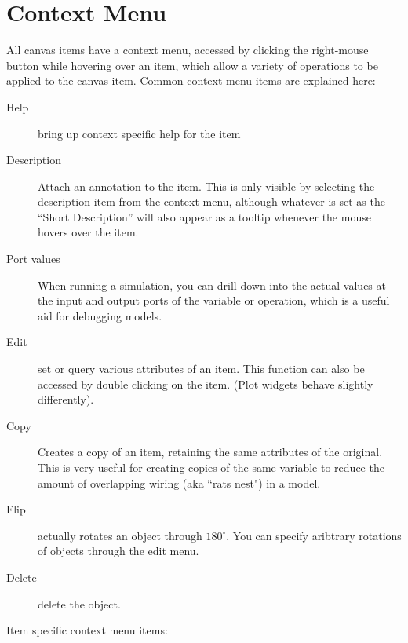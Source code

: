 \section{Context Menu}

All canvas items have a context menu, accessed by clicking the right-mouse
button while hovering over an item, which allow a variety of operations
to be applied to the canvas item. Common context menu items are explained
here: 
\begin{description}
\item [{Help}] bring up context specific help for the item 
\item [{Description}] Attach an annotation to the item. This is only visible
by selecting the description item from the context menu, although
whatever is set as the ``Short Description'' will also appear as
a tooltip whenever the mouse hovers over the item. 
\item [{Port values}] When running a simulation, you can drill down into
the actual values at the input and output ports of the variable or
operation, which is a useful aid for debugging models. 
\item [{Edit}] set or query various attributes of an item. This function
can also be accessed by double clicking on the item. (Plot widgets
behave slightly differently). 
\item [{Copy}] Creates a copy of an item, retaining the same attributes
of the original. This is very useful for creating copies of the same
variable to reduce the amount of overlapping wiring (aka ``rats nest")
in a model. 
\item [{Flip}] actually rotates an object through $180^{\circ}$. You can
specify aribtrary rotations of objects through the edit menu. 
\item [{Delete}] delete the object. 
\end{description}
Item specific context menu items: 

